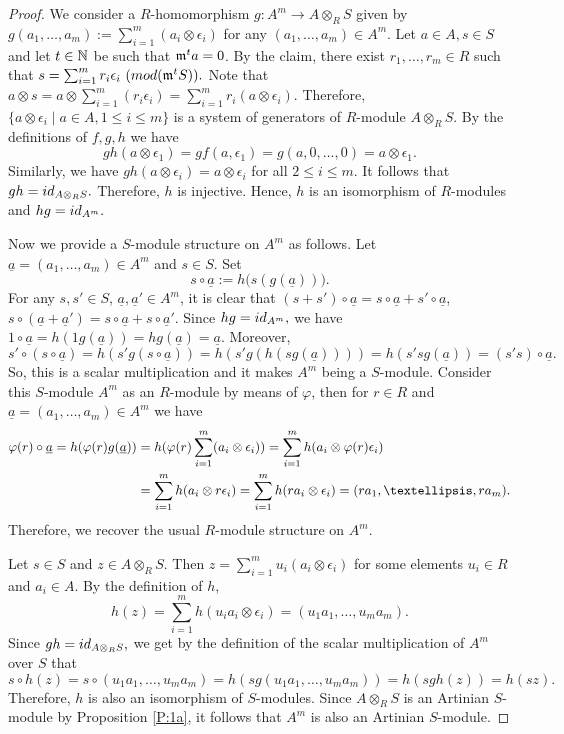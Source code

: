 \documentclass[10pt,a4paper]{amsart}
\begin{document}
\begin{proof}
We consider a $R$-homomorphism $g: A^m\rightarrow A\otimes_RS$  given by $g(a_1, \ldots , a_m):=\sum_{i=1}^m(a_i\otimes\epsilon_i)$ for any $(a_1, \ldots , a_m)\in A^m$. Let $a\in A, s\in S$ and let  $t\in\Bbb N$ be such that $\frak m^ta=0$.  By the claim, there exist $r_1, \ldots , r_m\in R$ such that $s=\sum_{i=1}^m r_i\epsilon_i\ ({\rm mod}(\frak m^tS)).$ Note that 
$a\otimes s=a\otimes \sum_{i=1}^m (r_i\epsilon_i)=\sum_{i=1}^m r_i(a\otimes \epsilon_i).$ Therefore,  $\{a\otimes \epsilon_i\mid a\in A, 1\leq i\leq m\}$ is a system of generators of $R$-module $A\otimes_R S$. By the definitions of $f, g, h$ we have 
$$gh(a\otimes \epsilon_1)=gf(a,\epsilon_1)=g(a,0, \ldots ,0)=a\otimes\epsilon_1.$$ Similarly, we have $gh(a\otimes \epsilon_i)=a\otimes\epsilon_i$ for all $2\leq i\leq m.$ It follows that $gh={\rm id}_{A\otimes_RS}.$ Therefore, $h$ is injective. Hence, $h$ is an isomorphism of $R$-modules and $hg={\rm id}_{A^m}.$ 

Now we provide a  $S$-module structure on $A^m$ as follows. Let $\underline a=(a_1, \ldots , a_m)\in A^m$ and $s\in S.$  Set $$s\circ\underline a:=h\big(s(g(\underline a))\big).$$
For any $s, s'\in S$, $\underline a, \underline a'\in A^m$, it is clear that $(s+s')\circ\underline a=s\circ\underline a+s'\circ\underline a$, $s\circ(\underline a+\underline a')=s\circ\underline a +s\circ\underline a'$. Since $hg={\rm id}_{A^m},$ we have $1\circ\underline a=h(1g(\underline a))=hg(\underline a)=\underline a.$ Moreover, 
$$s'\circ(s\circ\underline a)=h(s'g(s\circ\underline a))=h(s'g(h(sg(\underline a))))=h(s'sg(\underline a))=(s's)\circ\underline a.$$ So, this is a scalar multiplication and it makes $A^m$ being a $S$-module. Consider this $S$-module $A^m$ as an $R$-module by means of $\varphi$, then for $r\in R$ and $\underline a=(a_1, \ldots , a_m)\in A^m$ we have  
\begin{align}\varphi(r)\circ\underline a=h(\varphi(r)g(\underline a))&=h(\varphi(r)\sum_{i=1}^m(a_i\otimes\epsilon_i))=\sum_{i=1}^m h(a_i\otimes \varphi(r)\epsilon_i)\notag\\
&=\sum_{i=1}^m h(a_i\otimes r\epsilon_i)=\sum_{i=1}^m h(ra_i\otimes \epsilon_i)=(ra_1, \ldots , ra_m).\notag\end{align} Therefore, we recover the usual $R$-module structure on $A^m$. 

Let $s\in S$ and $z\in A\otimes_RS.$ Then $\displaystyle z=\sum_{i=1}^m u_i(a_i\otimes \epsilon_i)$ for some elements $u_i\in R$ and $a_i\in A$. By the definition of $h$,  $$h(z)=\sum_{i=1}^m h(u_ia_i\otimes \epsilon_i)=(u_1a_1, \ldots , u_ma_m).$$ Since $gh={\rm id}_{A\otimes_RS},$ we get by the definition of the scalar multiplication of $A^m$ over $S$ that 
 $$s\circ h(z)=s\circ (u_1a_1, \ldots , u_ma_m)=h(sg(u_1a_1, \ldots , u_ma_m))=h(sgh(z))=h(sz).$$ Therefore, $h$ is also an isomorphism of $S$-modules. Since $A\otimes_RS$ is an Artinian $S$-module by Proposition \ref{P:1a}, it follows that  $A^m$ is also an Artinian $S$-module.
\end{proof}
\end{document}
